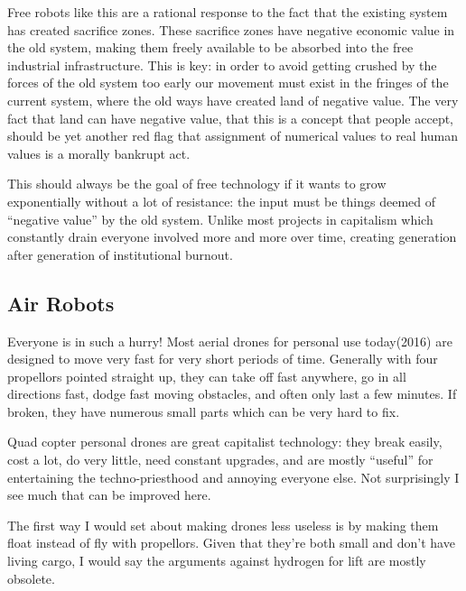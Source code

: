 \documentclass[11pt]{article}
\begin{document}
Free robots like this are a rational response to the fact that the
existing system has created sacrifice zones. These sacrifice zones have
negative economic value in the old system, making them freely available
to be absorbed into the free industrial infrastructure. This is key: in
order to avoid getting crushed by the forces of the old system too early
our movement must exist in the fringes of the current system, where the
old ways have created land of negative value. The very fact that land
can have negative value, that this is a concept that people accept,
should be yet another red flag that assignment of numerical values to
real human values is a morally bankrupt act.

This should always be the goal of free technology if it wants to grow
exponentially without a lot of resistance: the input must be things
deemed of ``negative value'' by the old system. Unlike most projects in
capitalism which constantly drain everyone involved more and more over
time, creating generation after generation of institutional burnout.

\subsection{Air Robots}\label{air-robots}

Everyone is in such a hurry! Most aerial drones for personal use
today(2016) are designed to move very fast for very short periods of
time. Generally with four propellors pointed straight up, they can take
off fast anywhere, go in all directions fast, dodge fast moving
obstacles, and often only last a few minutes. If broken, they have
numerous small parts which can be very hard to fix.

Quad copter personal drones are great capitalist technology: they break
easily, cost a lot, do very little, need constant upgrades, and are
mostly ``useful'' for entertaining the techno-priesthood and annoying
everyone else. Not surprisingly I see much that can be improved here.

The first way I would set about making drones less useless is by making
them float instead of fly with propellors. Given that they're both small
and don't have living cargo, I would say the arguments against hydrogen
for lift are mostly obsolete.
\end{document}
